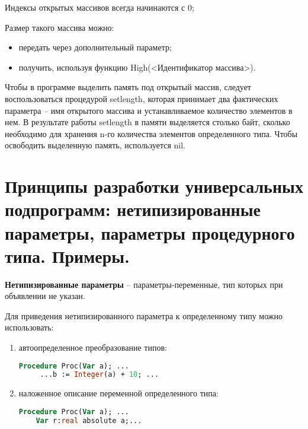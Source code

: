 Индексы открытых массивов всегда начинаются с 0;

Размер такого массива можно:
\begin{itemize}
\item передать через дополнительный параметр;
\item получить, используя функцию High(<Идентификатор массива>).
\end{itemize}

Чтобы в программе выделить память под открытый массив, следует воспользоваться процедурой setlength, которая принимает два фактических параметра – имя открытого массива и устанавливаемое количество элементов в нем. В результате работы setlength в памяти выделяется столько байт, сколько необходимо для хранения n-го количества элементов определенного типа. Чтобы освободить выделенную память, используется nil.







\newpage\section{Принципы разработки универсальных подпрограмм:  нетипизированные параметры, параметры процедурного типа. Примеры. }


\begin{myquote}
            
\end{myquote}

{\bf Нетипизированные параметры} – параметры-переменные, тип которых при объявлении не указан.

Для приведения нетипизированного параметра к определенному типу можно использовать:

\begin{enumerate}
\item автоопределенное преобразование типов:
\begin{lstlisting}[language = pascal]
 	Procedure Proc(Var a); ...
  	 ...b := Integer(а) + 10; ...
\end{lstlisting}

\item наложенное описание переменной определенного типа:
\begin{lstlisting}[language = pascal]
 	Procedure Proc(Var a); ...
    Var r:real absolute a;...
\end{lstlisting}
\end{enumerate}

